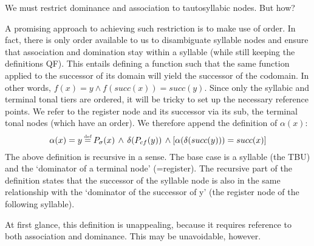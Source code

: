 \documentclass{article}
\newcommand\myeq{\mathrel{\stackrel{\makebox[0pt]{\mbox{\normalfont\tiny def}}}{=}}}
\begin{document}
We must restrict dominance and association to tautosyllabic nodes. But how? \par
A promising approach to achieving such restriction is to make use of order. In fact, there is only order available to us to disambiguate syllable nodes and ensure that association and domination stay within a syllable (while still keeping the definitions QF). This entails defining a function such that the same function applied to the successor of its domain will yield the successor of the codomain. In other words, $f(x) = y \land f(succ(x)) = succ(y)$. Since only the syllabic and terminal tonal tiers are ordered, it will be tricky to set up the necessary reference points. We refer to the register node and its successor via its sub, the terminal tonal nodes (which have an order). We therefore append the definition of $\alpha(x)$:
\begin{equation}
\alpha(x) = y \myeq P_{\sigma}(x)\,\land\,\delta(P_{cf}(y))\,\land[\alpha(\delta(succ(y)))=succ(x)]
\end{equation}
The above definition is recursive in a sense. The base case is a syllable (the TBU) and the `dominator of a terminal node' (=register). The recursive part of the definition states that the successor of the syllable node is also in the same relationship with the `dominator of the successor of y' (the register node of the following syllable). \\
\begin{center}
\end{center}
At first glance, this definition is unappealing, because it requires reference to both association and dominance. This may be unavoidable, however. \par
\end{document}
